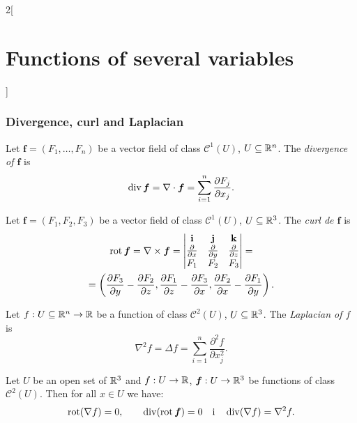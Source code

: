 \documentclass[../../../main.tex]{subfiles}
\begin{document}
\begin{multicols}{2}[\section{Functions of several variables}]
\subsubsection*{Divergence, curl and Laplacian}
\begin{definition}
Let $\boldsymbol{f}=(F_1,\ldots, F_n)$ be a vector field of class $\mathcal{C}^1(U)$, $U\subseteq\mathbb{R}^n$. The \textit{divergence of $\boldsymbol{f}$} is $$\operatorname{div}\boldsymbol{f}=\nabla\cdot\boldsymbol{f}=\sum_{i=1}^n\frac{\partial F_j}{\partial x_j}.$$
\end{definition}
\begin{definition}
Let $\boldsymbol{f}=(F_1,F_2,F_3)$ be a vector field of class $\mathcal{C}^1(U)$, $U\subseteq\mathbb{R}^3$. The \textit{curl de $\boldsymbol{f}$} is \begin{multline*}
    \operatorname{rot}\boldsymbol{f}=\nabla\times\boldsymbol{f}=\begin{vmatrix}
    \textbf{i} & \textbf{j} & \textbf{k}\\
    \frac{\partial}{\partial x} & \frac{\partial}{\partial y} & \frac{\partial}{\partial z}\\
    F_1 & F_2 & F_3\\
    \end{vmatrix}=\\=\left(\frac{\partial F_3}{\partial y}-\frac{\partial F_2}{\partial z},\frac{\partial F_1}{\partial z}-\frac{\partial F_3}{\partial x},\frac{\partial F_2}{\partial x}-\frac{\partial F_1}{\partial y}\right).
\end{multline*}
\end{definition}
\begin{definition}
Let $f:U\subseteq\mathbb{R}^n\rightarrow\mathbb{R} $ be a function of class $\mathcal{C}^2(U)$, $U\subseteq\mathbb{R}^3$. The \textit{Laplacian of $f$} is $$\nabla^2f=\Delta f=\sum_{i=1}^n\frac{\partial^2 f}{\partial x_j^2}.$$
\end{definition}
\begin{prop}
Let $U$ be an open set of $\mathbb{R}^3$ and $f:U\rightarrow\mathbb{R} $, $\boldsymbol{f}:U\rightarrow\mathbb{R}^3$ be functions of class $\mathcal{C}^2(U)$. Then for all $x\in U$ we have: $$\operatorname{rot}(\nabla f)=0,\qquad\operatorname{div}(\operatorname{rot}\boldsymbol{f})=0\quad\text{i}\quad\operatorname{div}(\nabla f)=\nabla^2 f.$$
\end{prop}

\end{multicols}
\end{document}
